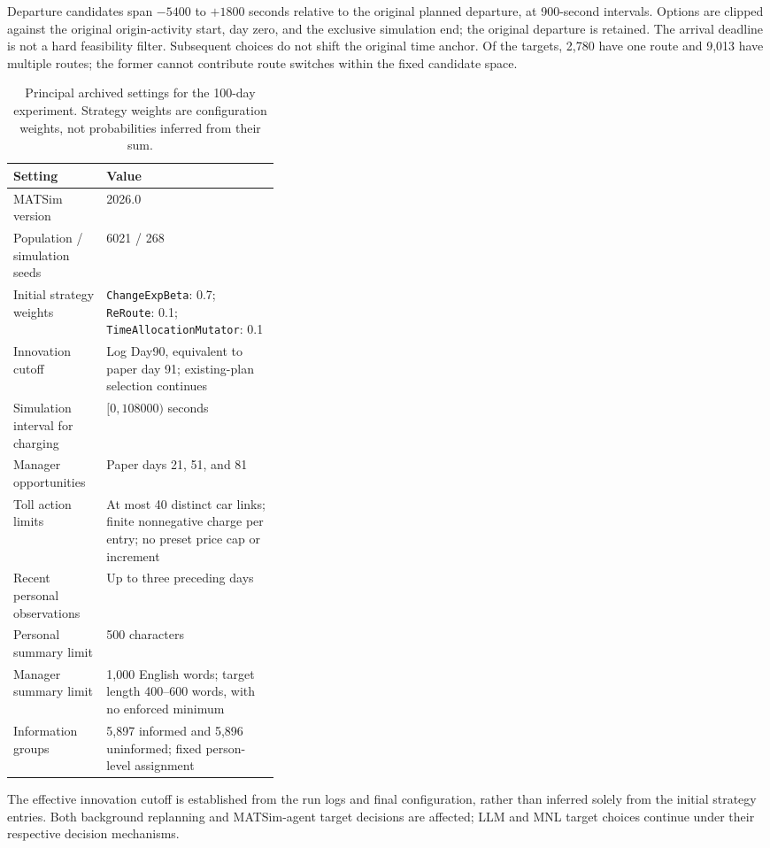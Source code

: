 Departure candidates span $-5400$ to $+1800$ seconds relative to the original planned departure, at 900-second intervals. Options are clipped against the original origin-activity start, day zero, and the exclusive simulation end; the original departure is retained. The arrival deadline is not a hard feasibility filter. Subsequent choices do not shift the original time anchor. Of the targets, 2,780 have one route and 9,013 have multiple routes; the former cannot contribute route switches within the fixed candidate space.

\begin{table}[htbp]
\centering\small
\caption{Principal archived settings for the 100-day experiment. Strategy weights are configuration weights, not probabilities inferred from their sum.}
\label{tab:configuration}
\renewcommand{\arraystretch}{1.15}
\begin{tabularx}{\linewidth}{@{}>{\raggedright\arraybackslash}p{0.35\linewidth}X@{}}
\toprule
Setting & Value \\
\midrule
MATSim version & 2026.0 \\
Population / simulation seeds & 6021 / 268 \\
Initial strategy weights & \texttt{ChangeExpBeta}: 0.7; \texttt{ReRoute}: 0.1; \texttt{TimeAllocationMutator}: 0.1 \\
Innovation cutoff & Log Day90, equivalent to paper day 91; existing-plan selection continues \\
Simulation interval for charging & $[0,108000)$ seconds \\
Manager opportunities & Paper days 21, 51, and 81 \\
Toll action limits & At most 40 distinct car links; finite nonnegative charge per entry; no preset price cap or increment \\
Recent personal observations & Up to three preceding days \\
Personal summary limit & 500 characters \\
Manager summary limit & 1,000 English words; target length 400--600 words, with no enforced minimum \\
Information groups & 5,897 informed and 5,896 uninformed; fixed person-level assignment \\
\bottomrule
\end{tabularx}
\end{table}

The effective innovation cutoff is established from the run logs and final configuration, rather than inferred solely from the initial strategy entries. Both background replanning and MATSim-agent target decisions are affected; LLM and MNL target choices continue under their respective decision mechanisms.

